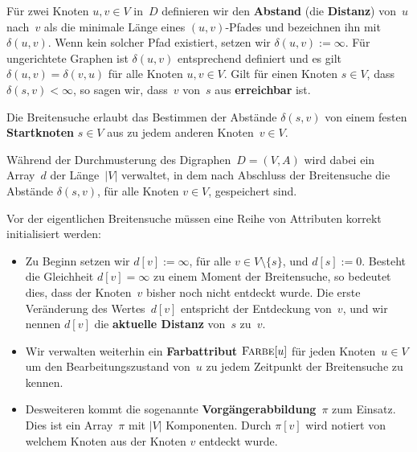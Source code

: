 \begin{defn}
Für zwei Knoten $u,v \in V$ in~$D$ definieren wir den \textbf{Abstand} (die \textbf{Distanz}) von~$u$ nach~$v$ als die minimale Länge eines $(u,v)$-Pfades und bezeichnen ihn mit $\delta(u,v)$.
Wenn kein solcher Pfad existiert, setzen wir $\delta(u,v):=\infty$.
Für ungerichtete Graphen ist $\delta(u,v)$ entsprechend definiert und es gilt $\delta(u,v)=\delta(v,u)$ für alle Knoten $u,v \in V$.
Gilt für einen Knoten $s \in V$, dass $\delta(s,v) < \infty$, so sagen wir, dass~$v$ von~$s$ aus \textbf{erreichbar} ist.
\end{defn} 

\begin{bem} 
Die Breitensuche erlaubt das Bestimmen der Abstände $\delta(s,v)$ von einem festen \textbf{Startknoten} $s \in V$ aus zu jedem anderen Knoten~$v \in V$.

Während der Durchmusterung des Digraphen~$D=(V,A)$ wird dabei ein Array~$d$ der Länge~$|V|$ verwaltet, in dem nach Abschluss der Breitensuche die Abstände $\delta(s,v)$, für alle Knoten $v \in V$, gespeichert sind.
\end{bem} 


\begin{bem} 
Vor der eigentlichen Breitensuche müssen eine Reihe von Attributen korrekt initialisiert werden:
\begin{itemize}
 \item Zu Beginn setzen wir $d[v]:=\infty$, für alle $v \in V \setminus \{s\}$, und $d[s]:=0$.
Besteht die Gleichheit $d[v]=\infty$ zu einem Moment der Breitensuche, so bedeutet dies, dass der Knoten~$v$ bisher noch nicht entdeckt wurde.
Die erste Veränderung des Wertes~$d[v]$ entspricht der Entdeckung von~$v$, und wir nennen $d[v]$ die \textbf{aktuelle Distanz} von~$s$ zu~$v$. 
 \item Wir verwalten weiterhin ein \textbf{Farbattribut} $\mathop{\text{\textsc{Farbe}}}[u]$ für jeden Knoten~$u \in V$ um den Bearbeitungszustand von~$u$ zu jedem Zeitpunkt der Breitensuche zu kennen.
 \item Desweiteren kommt die sogenannte \textbf{Vorgängerabbildung}~$\pi$ zum Einsatz.
 Dies ist ein Array~$\pi$ mit $|V|$ Komponenten.
	Durch $\pi[v]$ wird notiert von welchem Knoten aus der Knoten $v$ entdeckt wurde.
\end{itemize}
\end{bem} 


